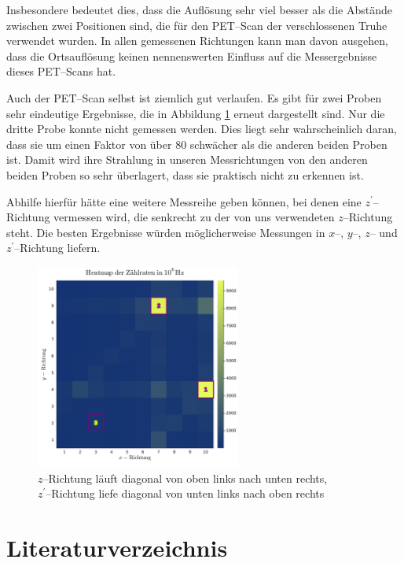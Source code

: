 \documentclass[12pt,a4paper]{scrartcl}
\numberwithin{equation}{section} %
\begin{document}
Insbesondere bedeutet dies, dass die Auflösung sehr viel besser als die Abstände zwischen zwei Positionen sind, die für den PET--Scan der verschlossenen Truhe verwendet wurden. In allen gemessenen Richtungen kann man davon ausgehen, dass die Ortsauflösung keinen nennenswerten Einfluss auf die Messergebnisse dieses PET--Scans hat.

Auch der PET--Scan selbst ist ziemlich gut verlaufen. Es gibt für zwei Proben sehr eindeutige Ergebnisse, die in Abbildung \ref{abb:heatmap} erneut dargestellt sind. Nur die dritte Probe konnte nicht gemessen werden. Dies liegt sehr wahrscheinlich daran, dass sie um einen Faktor von über $80$ schwächer als die anderen beiden Proben ist. Damit wird ihre Strahlung in unseren Messrichtungen von den anderen beiden Proben so sehr überlagert, dass sie praktisch nicht zu erkennen ist.

Abhilfe hierfür hätte eine weitere Messreihe geben können, bei denen eine $z^\prime$--Richtung vermessen wird, die senkrecht zu der von uns verwendeten $z$--Richtung steht. Die besten Ergebnisse würden möglicherweise Messungen in $x$--, $y$--, $z$-- und $z^\prime$--Richtung liefern.

\begin{figure}[h]
	\centering
	\vspace{24pt}
	\includegraphics[width=0.6\textwidth]{../media/B3.4/heatmap.png}
	\caption{$z$--Richtung läuft diagonal von oben links nach unten rechts, \\
		$z^\prime$--Richtung liefe diagonal von unten links nach oben rechts}
	\label{abb:heatmap}
\end{figure}

\clearpage
\hypertarget{literatur}{\section{Literaturverzeichnis}\label{literatur}}
\renewcommand{\section}[2]{}
\end{document}

